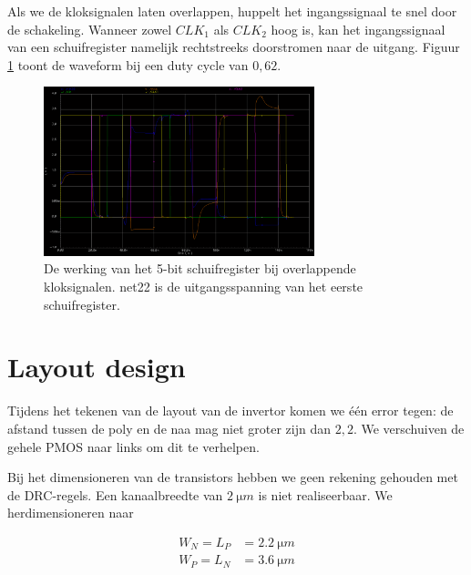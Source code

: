 \documentclass[11pt,a4paper,oneside,dutch]{article}
\begin{document}
Als we de kloksignalen laten overlappen, huppelt het ingangssignaal te snel door de schakeling. Wanneer zowel $CLK_1$ als $CLK_2$ hoog is, kan het ingangssignaal van een schuifregister namelijk rechtstreeks doorstromen naar de uitgang. Figuur \ref{fig:wave_overlap} toont de waveform bij een duty cycle van $0,62$.

\begin{figure}[htp]
	\centering
	\includegraphics[width=0.7\textwidth]{wave_overlap.png}
	\caption{De werking van het 5-bit schuifregister bij overlappende kloksignalen. net22 is de uitgangsspanning van het eerste schuifregister.}
	\label{fig:wave_overlap}
\end{figure}



\section{Layout design}

Tijdens het tekenen van de layout van de invertor komen we één error tegen: de afstand tussen de poly en de naa mag niet groter zijn dan $2,2$. We verschuiven de gehele PMOS naar links om dit te verhelpen.

Bij het dimensioneren van de transistors hebben we geen rekening gehouden met de DRC-regels. Een kanaalbreedte van $\SI{2}{\micro m}$ is niet realiseerbaar. We herdimensioneren naar

\begin{align*}
W_N = L_P &= \SI{2,2}{\micro m} \\
W_P = L_N &= \SI{3,6}{\micro m}
\end{align*}
\end{document}
